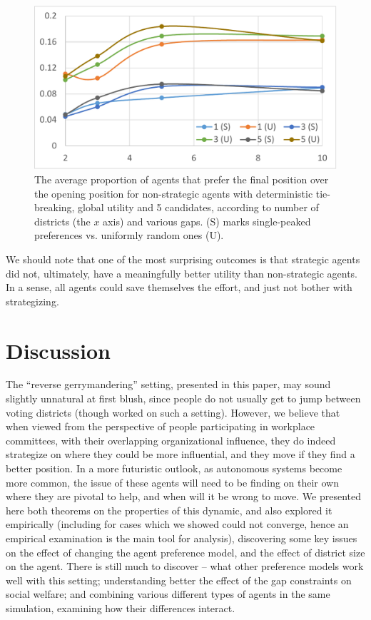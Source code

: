 \documentclass[letterpaper]{article} %
\begin{document}
\begin{figure}
	\centering
	\includegraphics[width=\columnwidth]{by_gap_by_sp_rev_stats_agent_util_imp_v_53_tb_True_st_False_gr_True_can_5_N_1000_new.pdf}
	\caption{The average proportion of agents that prefer the final position over the opening position
		 for non-strategic agents with deterministic tie-breaking, global utility and 5 candidates, according to number of districts (the $x$ axis) and various gaps. (S) marks single-peaked preferences vs. uniformly random ones (U).}
	\label{fig:SPGlob}
\end{figure}

We should note that one of the most surprising outcomes is that strategic agents did not, ultimately, have a meaningfully better utility than non-strategic agents. In a sense, all agents could save themselves the effort, and just not bother with strategizing.

\section{Discussion}

The ``reverse gerrymandering'' setting, presented in this paper, may sound slightly unnatural at first blush, since people do not usually get to jump between voting districts (though \cite{BM12} worked on such a setting). However, we believe that when viewed from the perspective of people participating in workplace committees, with their overlapping organizational influence, they do indeed strategize on where they could be more influential, and they move if they find a better position. In a more futuristic outlook, as autonomous systems become more common, the issue of these agents will need to be finding on their own where they are pivotal to help, and when will it be wrong to move.
We presented here both theorems on the properties of this dynamic, and also explored it empirically (including for cases which we showed could not converge, hence an empirical examination is the main tool for analysis), discovering some key issues on the effect of changing the agent preference model, and the effect of district size on the agent. There is still much to discover -- what other preference models work well with this setting; understanding better the effect of the gap constraints on social welfare; and combining various different types of agents in the same simulation, examining how their differences interact.
\end{document}
